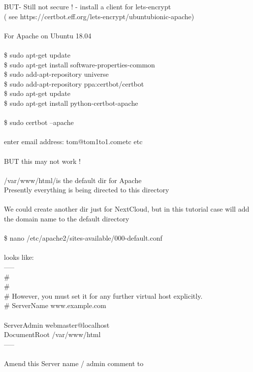 \documentclass[10pt,a4paper]{article}
\begin{document}
{	BUT- Still not secure ! - install a client for lets-encrypt\\
	( see https://certbot.eff.org/lets-encrypt/ubuntubionic-apache}{\large  )\\
\\
	For Apache on Ubuntu 18.04\\
\\
	\$ sudo apt-get update\\
	\$ sudo apt-get install software-properties-common\\
	\$ sudo add-apt-repository universe\\
	\$ sudo add-apt-repository ppa:certbot/certbot\\
	\$ sudo apt-get update\\
	\$ sudo apt-get install python-certbot-apache \\
\\
	\$ sudo certbot --apache\\
	\\
	enter email address: tom@tom1to1.com}{\large  etc etc\\
\\
	BUT this may not work !\\
	\\
	/var/www/html/}{\large  is the default dir for Apache \\
	Presently everything is being directed to this directory\\
\\
	We could create another dir just for NextCloud, but in this tutorial case will add\\
	the domain name to the default directory\\
\\
	\$ nano /etc/apache2/sites-available/000-default.conf}{\large \\
\\
	looks like:\\
	-----\\
	\#\\
	\#\\
	\# However, you must set it for any further virtual host explicitly.\\
	\# ServerName www.example.com}{\large \\
	\\
	ServerAdmin webmaster@localhost\\
	DocumentRoot /var/www/html}{\large \\
	-----\\
\\
	Amend this Server name / admin comment to\\
}
\end{document}
